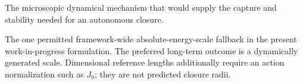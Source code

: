 \documentclass[11pt]{article}
\theoremstyle{definition}
\begin{document}
\begin{description}[style=nextline]
\item[Binder]
The microscopic dynamical mechanism that would supply the capture and stability needed
for an autonomous closure.

\item[$\Lambda_C$]
The one permitted framework-wide absolute-energy-scale fallback in the present
work-in-progress formulation.  The preferred long-term outcome is a dynamically
generated scale.  Dimensional reference lengths additionally require an action
normalization such as $J_0$; they are not predicted closure radii.
\end{description}

\newpage

\printbibliography
\end{document}
